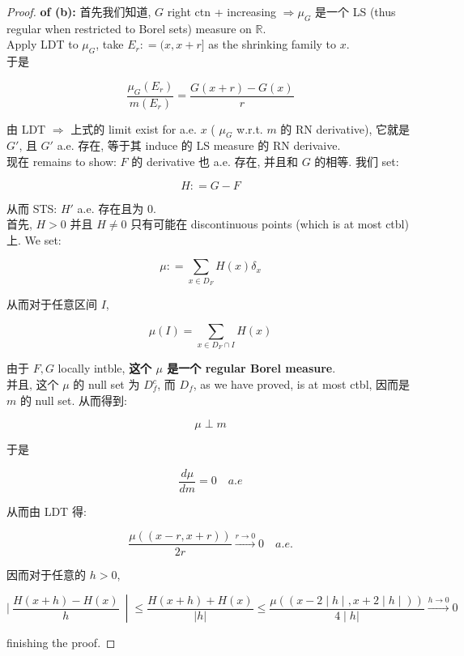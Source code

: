 \documentclass{qlnotes-export}
\begin{document}
\begin{proof}

\textbf{of (b):} 首先我们知道, \(G\) right ctn + increasing \(\Longrightarrow\mu_{G}\) 是一个 LS (thus regular when restricted to Borel sets) measure on \(\mathbb{R}\).\\
Apply LDT to \(\mu_{G}\), take \(E_{r}: = (x,x + r\rbrack\) as the shrinking family to \(x\).\\
于是

\[\frac{\mu_{G}(E_{r})}{m(E_{r})} = \frac{G(x + r) - G(x)}{r}\]

由 LDT \(\Longrightarrow\) 上式的 limit exist for a.e. \(x\) ( \(\mu_{G}\) w.r.t. \(m\) 的 RN derivative), 它就是 \(G'\), 且 \(G'\) a.e. 存在, 等于其 induce 的 LS measure 的 RN derivaive.\\
现在 remains to show: \(F\) 的 derivative 也 a.e. 存在, 并且和 \(G\) 的相等. 我们 set:

\[H: = G - F\]

从而 STS: \(H'\) a.e. 存在且为 \(0\).\\
首先, \(H > 0\) 并且 \(H \neq 0\) 只有可能在 discontinuous points (which is at most ctbl)上. We set:

\[\mu: = \sum\limits_{x \in D_{F}}H(x)\delta_{x}\]

从而对于任意区间 \(I\),

\[\mu(I) = \sum\limits_{x \in D_{F} \cap I}H(x)\]

由于 \(F,G\) locally intble, \textbf{这个 \(\mu\) 是一个 regular Borel measure}.\\
并且, 这个 \(\mu\) 的 null set 为 \(D_{f}^{c}\), 而 \(D_{f}\), as we have proved, is at most ctbl, 因而是 \(m\) 的 null set. 从而得到:

\[\mu \perp m\]

于是

\[\frac{d\mu}{dm} = 0\quad a.e\]

从而由 LDT 得:

\[\frac{\mu((x - r,x + r))}{2r}\overset{r\rightarrow 0}{\rightarrow}0\quad a.e.\]

因而对于任意的 \(h > 0\),

\[\left. |\ \frac{H(x + h) - H(x)}{h}\  \middle| \leq \frac{H(x + h) + H(x)}{|h|} \leq \frac{\left. \mu((x - 2 \middle| h \middle| ,x + 2 \middle| h \middle| )) \right.}{\left. 4 \middle| h| \right.}\overset{h\rightarrow 0}{\rightarrow}0 \right.\]

finishing the proof.

\end{proof}
\end{document}
